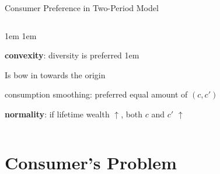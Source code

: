 \documentclass[11pt,aspectratio=43]{beamer}
\let\olditemize=\itemize
\let\endolditemize=\enditemize
\renewenvironment{itemize}{\olditemize \itemsep1em}{\endolditemize}
\let\oldenumerate=\enumerate
\let\endoldenumerate=\endenumerate
\renewenvironment{enumerate}{\oldenumerate \itemsep1em}{ \endoldenumerate}
\theoremstyle{definition}
\begin{document}
\begin{frame}{Consumer Preference in Two-Period Model}
\begin{columns}
\begin{column}{0.6\textwidth}
\begin{enumerate}
\begin{itemize}
            \end{itemize}
            \item \textbf{convexity}: diversity is preferred
            \begin{itemize}
                \item Is bow in towards the origin
                \item \alert{consumption smoothing}: preferred equal amount of $ ( c, c' ) $
            \end{itemize}
            \item \textbf{normality}: if lifetime wealth $ \uparrow  $, both $ c $ and $ c' $ $ \uparrow  $
        \end{enumerate}
    \end{column}
\end{columns}
\end{frame}

\section{Consumer's Problem}
\label{sec:Consumer_s_Problem}
\end{document}

